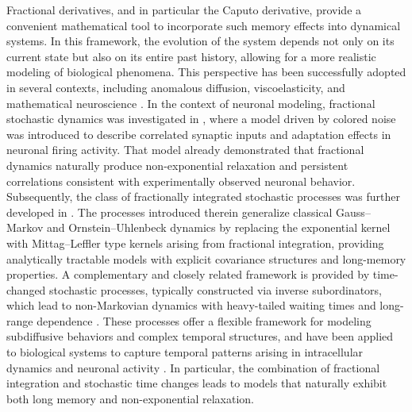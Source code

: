 \documentclass[11pt,reqno,oneside, a4paper]{amsart}
\numberwithin{equation}{section}
\theoremstyle{remark}
\begin{document}
Fractional derivatives, and in particular the Caputo derivative, provide a convenient mathematical tool to incorporate such memory effects into dynamical systems. In this framework, the evolution of the system depends not only on its current state but also on its entire past history, allowing for a more realistic modeling of biological phenomena. This perspective has been successfully adopted in several contexts, including anomalous diffusion, viscoelasticity, and mathematical neuroscience \cite{Pirozzi2024b,Teka2014}.
In the context of neuronal modeling, fractional stochastic dynamics was investigated in \cite{Pirozzi2018}, where a model driven by colored noise was introduced to describe correlated synaptic inputs and adaptation effects in neuronal firing activity. That model already demonstrated that fractional dynamics naturally produce non-exponential relaxation and persistent correlations consistent with experimentally observed neuronal behavior. Subsequently, the class of fractionally integrated stochastic processes was further developed in \cite{AbundoPirozzi2021,Pirozzi2024}. The processes introduced therein generalize classical Gauss--Markov and Ornstein--Uhlenbeck dynamics by replacing the exponential kernel with Mittag--Leffler type kernels arising from fractional integration, providing analytically tractable models with explicit covariance structures and long-memory properties.
A complementary and closely related framework is provided by time-changed stochastic processes, typically constructed via inverse subordinators, which lead to non-Markovian dynamics with heavy-tailed waiting times and long-range dependence \cite{MeerschaertStraka2013}. These processes offer a flexible framework for modeling subdiffusive behaviors and complex temporal structures, and have been applied to biological systems to capture temporal patterns arising in intracellular dynamics and neuronal activity \cite{LeonenkoPirozzi2025}. In particular, the combination of fractional integration and stochastic time changes leads to models that naturally exhibit both long memory and non-exponential relaxation. 
\end{document}
